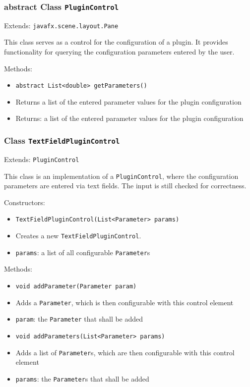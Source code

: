 \documentclass[parskip=full,11pt]{scrartcl}
\begin{document}
\subsubsection{abstract Class \texttt{PluginControl}}
Extends: \texttt{javafx.scene.layout.Pane}
 
This class serves as a control for the configuration of a plugin. It provides functionality for querying the configuration parameters entered by the user.

Methods:

\begin{itemize}\itemsep -10pt
	\item \texttt{abstract List<double> getParameters()}
	\item[] Returns a list of the entered parameter values for the plugin configuration
	\item[] Returns: a list of the entered parameter values for the plugin configuration
\end{itemize}

\subsubsection{Class \texttt{TextFieldPluginControl}}
Extends: \texttt{PluginControl}
 
This class is an implementation of a \texttt{PluginControl}, where the configuration parameters are entered via text fields. The input is still checked for correctness.

Constructors:

\begin{itemize}\itemsep -10pt
	\item \texttt{TextFieldPluginControl(List<Parameter> params)}
	\item[] Creates a new \texttt{TextFieldPluginControl}.
	\item[] \texttt{params}: a list of all configurable \texttt{Parameter}s
\end{itemize}

Methods:

\begin{itemize}\itemsep -10pt
	\item \texttt{void addParameter(Parameter param)}
	\item[] Adds a \texttt{Parameter}, which is then configurable with this control element
	\item[] \texttt{param}: the \texttt{Parameter} that shall be added
	\item \texttt{void addParameters(List<Parameter> params)}
	\item[] Adds a list of \texttt{Parameter}s, which are then configurable with this control element
	\item[] \texttt{params}: the \texttt{Parameter}s that shall be added
\end{itemize}
\end{document}
